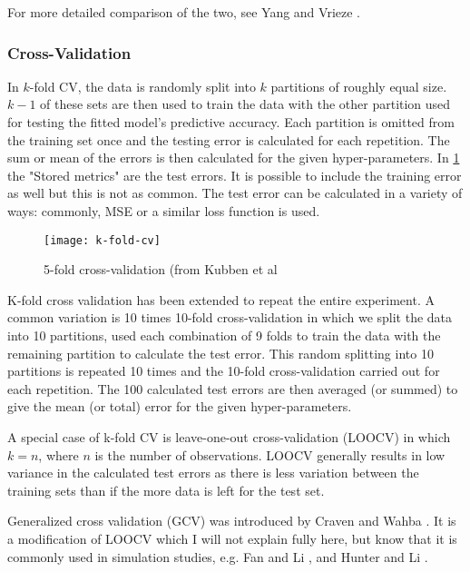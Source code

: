 For more detailed comparison of the two, see Yang  and Vrieze .

\subsubsection{Cross-Validation}

In $k$-fold CV, the data is randomly split into $k$ partitions of roughly equal size. $k-1$ of these sets are then used to train the data with the other partition used for testing the fitted model's predictive accuracy. Each partition is omitted from the training set once and the testing error is calculated for each repetition. The sum or mean of the errors is then calculated for the given hyper-parameters. In \cref{fig:k-fold-cv} the "Stored metrics" are the test errors. It is possible to include the training error as well but this is not as common. The test error can be calculated in a variety of ways: commonly, MSE or a similar loss function is used.

\begin{figure}[ht!]
  \texttt{[image: k-fold-cv]}
  \caption{5-fold cross-validation (from Kubben et al }
  \label{fig:k-fold-cv}
\end{figure}

K-fold cross validation has been extended to repeat the entire experiment. A common variation is 10 times 10-fold cross-validation in which we split the data into 10 partitions, used each combination of 9 folds to train the data with the remaining partition to calculate the test error. This random splitting into 10 partitions is repeated 10 times and the 10-fold cross-validation carried out for each repetition. The 100 calculated test errors are then averaged (or summed) to give the mean (or total) error for the given hyper-parameters.

A special case of k-fold CV is leave-one-out cross-validation (LOOCV) in which $k=n$, where $n$ is the number of observations. LOOCV generally results in low variance in the calculated test errors as there is less variation between the training sets than if the more data is left for the test set.

Generalized cross validation (GCV) was introduced by Craven and Wahba . It is a modification of LOOCV which I will not explain fully here, but know that it is commonly used in simulation studies, e.g. Fan and Li , and Hunter and Li .

